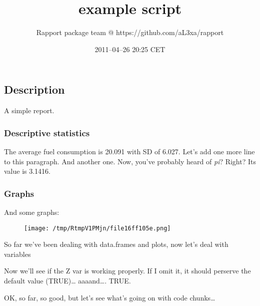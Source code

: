 \documentclass{article}
\title{example script}
\author{Rapport package team @ https://github.com/aL3xa/rapport}
\date{2011--04--26 20:25 CET}
\makeatletter
\def\maxwidth{\ifdim\Gin@nat@width>\linewidth\linewidth
\else\Gin@nat@width\fi}
\let\Oldincludegraphics\includegraphics
\renewcommand{\includegraphics}[1]{\Oldincludegraphics[width=\maxwidth]{#1}}
\makeatother
\begin{document}
\maketitle

\subsection{Description}

A simple report.

\subsubsection{Descriptive statistics}

The average fuel consumption is 20.091 with SD of 6.027. Let's add one
more line to this paragraph. And another one. Now, you've probably heard
of \emph{pi}? Right? Its value is 3.1416.

\subsubsection{Graphs}

And some graphs:

\begin{figure}[htbp]
\centering
\texttt{[image: /tmp/RtmpV1PMjn/file16ff105e.png]}
\caption{}
\end{figure}

So far we've been dealing with data.frames and plots, now let's deal
with variables

Now we'll see if the Z var is working properly. If I omit it, it should
perserve the default value (TRUE)\ldots{} aaaand\ldots{}. TRUE.

OK, so far, so good, but let's see what's going on with code
chunks\ldots{}
\end{document}
